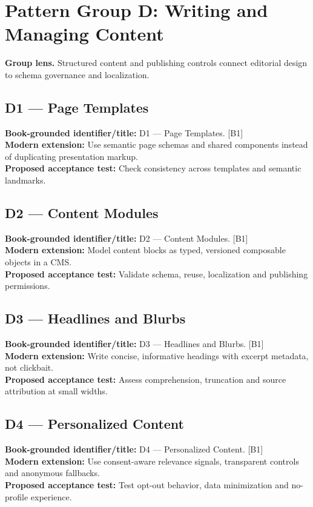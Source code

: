 \documentclass[11pt]{article}
\begin{document}
\section{Pattern Group D: Writing and Managing Content}

\begin{notebox}\textbf{Group lens.} Structured content and publishing controls connect editorial design to schema governance and localization.\end{notebox}
\subsection{D1 — Page Templates}
\noindent\textcolor{Ocean}{\textbf{Book-grounded identifier/title:}} D1 — Page Templates. [B1]\\
\textcolor{Mint}{\textbf{Modern extension:}} Use semantic page schemas and shared components instead of duplicating presentation markup.\\
\textcolor{Amber}{\textbf{Proposed acceptance test:}} Check consistency across templates and semantic landmarks.\medskip
\subsection{D2 — Content Modules}
\noindent\textcolor{Ocean}{\textbf{Book-grounded identifier/title:}} D2 — Content Modules. [B1]\\
\textcolor{Mint}{\textbf{Modern extension:}} Model content blocks as typed, versioned composable objects in a CMS.\\
\textcolor{Amber}{\textbf{Proposed acceptance test:}} Validate schema, reuse, localization and publishing permissions.\medskip
\subsection{D3 — Headlines and Blurbs}
\noindent\textcolor{Ocean}{\textbf{Book-grounded identifier/title:}} D3 — Headlines and Blurbs. [B1]\\
\textcolor{Mint}{\textbf{Modern extension:}} Write concise, informative headings with excerpt metadata, not clickbait.\\
\textcolor{Amber}{\textbf{Proposed acceptance test:}} Assess comprehension, truncation and source attribution at small widths.\medskip
\subsection{D4 — Personalized Content}
\noindent\textcolor{Ocean}{\textbf{Book-grounded identifier/title:}} D4 — Personalized Content. [B1]\\
\textcolor{Mint}{\textbf{Modern extension:}} Use consent-aware relevance signals, transparent controls and anonymous fallbacks.\\
\textcolor{Amber}{\textbf{Proposed acceptance test:}} Test opt-out behavior, data minimization and no-profile experience.\medskip
\end{document}
